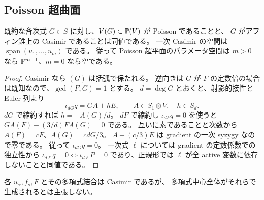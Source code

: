 \subsection{Poisson 超曲面}
\begin{proposition}\label{prop:pg-casimir}
既約な斉次式 $G\in S$ に対し、$V(G)\subset\mathbb P(V)$ が Poisson であることと、
$G$ がアフィン錐上の Casimir であることは同値である。
一次 Casimir の空間は $\operatorname{span}(u_1,\ldots,u_m)$ である。
従って Poisson 超平面のパラメータ空間は $m>0$ なら $\mathbb P^{m-1}$、$m=0$ なら空である。
\end{proposition}
\begin{proof}
Casimir なら $(G)$ は括弧で保たれる。
逆向きは $G$ が $F$ の定数倍の場合は既知なので、$\gcd(F,G)=1$ とする。
$d=\deg G$ とおくと、射影的接性と Euler 列より
\[
\iota_{dG}q=GA+hE,\qquad A\in S_1\otimes V,\quad h\in S_d.
\]
$dG$ で縮約すれば $h=-A(G)/d$。
$dF$ で縮約し $\iota_{dF}q=0$ を使うと
$GA(F)-(3/d)FA(G)=0$ である。
互いに素であることと次数から $A(F)=cF$、$A(G)=cdG/3$。
$A-(c/3)E$ は gradient の一次 syzygy なので零である。
従って $\iota_{dG}q=0$。
一次式 $\ell$ については gradient の定数係数での独立性から
$\iota_{d\ell}q=0\iff\iota_{d\ell}P=0$ であり、正規形では
$\ell$ が全 active 変数に依存しないことと同値である。
\end{proof}
各 $u_\alpha,f_s,F$ とその多項式結合は Casimir であるが、
多項式中心全体がそれらで生成されるとは主張しない。

